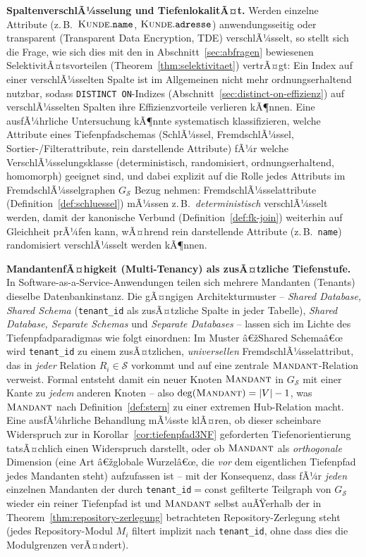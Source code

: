 ﻿\documentclass[a4paper,12pt]{report}
\theoremstyle{definition}
\theoremstyle{remark}
\begin{document}
\textbf{SpaltenverschlÃ¼sselung und TiefenlokalitÃ¤t.} Werden
einzelne Attribute (z.\,B.\ $\textsc{Kunde}.\texttt{name}$,
$\textsc{Kunde}.\texttt{adresse}$) anwendungsseitig oder
transparent (Transparent Data Encryption, TDE) verschlÃ¼sselt, so
stellt sich die Frage, wie sich dies mit den in
Abschnitt~\ref{sec:abfragen} bewiesenen SelektivitÃ¤tsvorteilen
(Theorem~\ref{thm:selektivitaet}) vertrÃ¤gt: Ein Index auf einer
verschlÃ¼sselten Spalte ist im Allgemeinen nicht mehr ordnungserhaltend
nutzbar, sodass \texttt{DISTINCT ON}-Indizes
(Abschnitt~\ref{sec:distinct-on-effizienz}) auf verschlÃ¼sselten
Spalten ihre Effizienzvorteile verlieren kÃ¶nnen. Eine ausfÃ¼hrliche
Untersuchung kÃ¶nnte systematisch klassifizieren, welche Attribute
eines Tiefenpfadschemas (SchlÃ¼ssel, FremdschlÃ¼ssel,
Sortier-/Filterattribute, rein darstellende Attribute) fÃ¼r welche
VerschlÃ¼sselungsklasse (deterministisch, randomisiert,
ordnungserhaltend, homomorph) geeignet sind, und dabei explizit auf
die Rolle jedes Attributs im FremdschlÃ¼sselgraphen $G_{\mathcal{S}}$
Bezug nehmen: FremdschlÃ¼sselattribute (Definition~\ref{def:schluessel})
mÃ¼ssen z.\,B.\ \emph{deterministisch} verschlÃ¼sselt werden, damit
der kanonische Verbund (Definition~\ref{def:fk-join}) weiterhin auf
Gleichheit prÃ¼fen kann, wÃ¤hrend rein darstellende Attribute (z.\,B.\
\texttt{name}) randomisiert verschlÃ¼sselt werden kÃ¶nnen.

\textbf{MandantenfÃ¤higkeit (Multi-Tenancy) als zusÃ¤tzliche
Tiefenstufe.} In Software-as-a-Service-Anwendungen teilen sich
mehrere Mandanten (Tenants) dieselbe Datenbankinstanz. Die gÃ¤ngigen
Architekturmuster -- \emph{Shared Database, Shared Schema}
(\texttt{tenant\_id} als zusÃ¤tzliche Spalte in jeder Tabelle),
\emph{Shared Database, Separate Schemas} und \emph{Separate
Databases} -- lassen sich im Lichte des Tiefenpfadparadigmas wie
folgt einordnen: Im Muster â€žShared Schemaâ€œ wird \texttt{tenant\_id}
zu einem zusÃ¤tzlichen, \emph{universellen} FremdschlÃ¼sselattribut, das
in \emph{jeder} Relation $R_i\in\mathcal{S}$ vorkommt und auf eine
zentrale $\textsc{Mandant}$-Relation verweist. Formal entsteht damit
ein neuer Knoten $\textsc{Mandant}$ in $G_{\mathcal{S}}$ mit einer
Kante zu \emph{jedem} anderen Knoten -- also $\deg(\textsc{Mandant})=
|V|-1$, was $\textsc{Mandant}$ nach Definition~\ref{def:stern} zu
einer extremen Hub-Relation macht. Eine ausfÃ¼hrliche Behandlung
mÃ¼sste klÃ¤ren, ob dieser scheinbare Widerspruch zur in
Korollar~\ref{cor:tiefenpfad3NF} geforderten Tiefenorientierung
tatsÃ¤chlich einen Widerspruch darstellt, oder ob $\textsc{Mandant}$
als \emph{orthogonale} Dimension (eine Art â€žglobale Wurzelâ€œ, die
\emph{vor} dem eigentlichen Tiefenpfad jedes Mandanten steht)
aufzufassen ist -- mit der Konsequenz, dass fÃ¼r \emph{jeden}
einzelnen Mandanten der durch \texttt{tenant\_id}$=$const gefilterte
Teilgraph von $G_{\mathcal{S}}$ wieder ein reiner Tiefenpfad ist und
$\textsc{Mandant}$ selbst auÃŸerhalb der in
Theorem~\ref{thm:repository-zerlegung} betrachteten
Repository-Zerlegung steht (jedes Repository-Modul $M_i$ filtert
implizit nach \texttt{tenant\_id}, ohne dass dies die Modulgrenzen
verÃ¤ndert).
\end{document}
